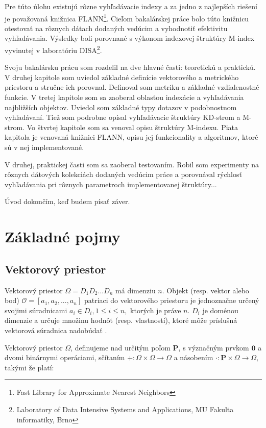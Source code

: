 \documentclass[12pt,a4paper,oneside]{fithesis2}
\begin{document}
Pre túto úlohu existujú rôzne vyhľadávacie indexy a za jedno z najlepších riešení je považovaná knižnica FLANN\footnote{Fast Library for Approximate Nearest Neighbors}. Cieľom bakalárskej práce bolo túto knižnicu otestovať na rôznych dátach dodaných vedúcim a vyhodnotiť efektivitu vyhľadávania. Výsledky boli porovnané s výkonom indexovej štruktúry M-index vyvinutej v laboratóriu DISA\footnote{Laboratory of Data Intensive Systems and Applications, MU Fakulta informatiky, Brno}.

Svoju bakalársku prácu som rozdelil na dve hlavné časti: teoretickú a praktickú. V druhej kapitole som uviedol základné definície vektorového a metrického priestoru a stručne ich porovnal. Definoval som metriku a základné vzdialenostné funkcie. V tretej kapitole som sa zaoberal oblasťou indexácie a vyhľadávania najbližších objektov. Uviedol som základné typy dotazov v podobnostnom vyhľadávaní. Tiež som podrobne opísal vyhľadávacie štruktúry KD-strom a M-strom. Vo štvrtej kapitole som sa venoval opisu štruktúry M-indexu. Piata kapitola je venovaná knižnici FLANN, opisu jej funkcionality a algoritmov, ktoré sú v nej implementované. 

V druhej, praktickej časti som sa zaoberal testovaním. Robil som experimenty na rôznych dátových kolekciách dodaných vedúcim práce a porovnával rýchlosť vyhľadávania pri rôznych parametroch implementovanej štruktúry...

Úvod dokončím, keď budem písať záver.

\chapter{Základné pojmy}
    
\section{Vektorový priestor}
    Vektorový priestor $ \Omega = D_1D_2. . .D_n $ má dimenziu $n$. Objekt (resp. vektor alebo bod)  $\mathcal{O} = [a_1, a_2, . . . , a_n] $ patriaci do vektorového priestoru je jednoznačne určený svojimi súradnicami $ a_i \in D_i, 1 \le i \le n, $ ktorých je práve $n$. $D_i$ je doménou dimenzie a určuje množinu hodnôt (resp. vlastností), ktoré môže príslušná vektorová súradnica nadobúdať \cite{stromy}.
    	
    Vektorový priestor $\Omega$, definujeme nad určitým poľom $\mathbf{P} $, s význačným prvkom $\mathbf{0}$ a dvomi binárnymi operáciami, sčítaním $+ : \Omega \times \Omega \rightarrow \Omega $  a násobením $\cdot : \mathbf{P}  \times \Omega \rightarrow \Omega$, takými že platí: 
     
\end{document}
